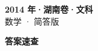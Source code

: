 \documentclass[zihao=-4, a4paper]{ctexart}
\begin{document}
\begin{center}
  {\Large\bfseries 2014 年·湖南卷·文科}\\[4pt]
  {\large 数学 · 简答版}
\end{center}
\medskip
{}

\clearpage
{}
\begin{center}{\Large\bfseries 答案速查}\end{center}
\medskip

\end{document}
